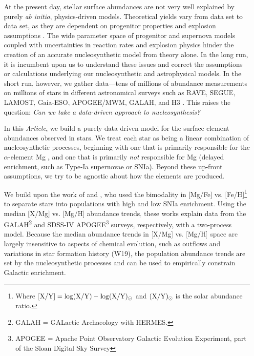 \documentclass[modern]{aastex631}
\newcommand{\documentname}{\textsl{Article}}
\begin{document}
At the present day, stellar surface abundances are not very well explained by purely \textsl{ab initio}, physics-driven models.
Theoretical yields vary from data set to data set, as they are dependent on progenitor properties and explosion assumptions \citep[e.g.,][]{rybizki2017, blancato2019, buck2021, griffith2021b}. 
The wide parameter space of progenitor and supernova models coupled with uncertainties in reaction rates and explosion physics hinder the creation of an accurate nucleosynthetic model from theory alone.
In the long run, it is incumbent upon us to understand these issues and correct the assumptions or calculations underlying our nucleosynthetic and astrophysical models.
In the short run, however, we gather data---tens of millions of abundance measurements on millions of stars in different astronomical surveys such as RAVE, SEGUE, LAMOST, Gaia-ESO, APOGEE/MWM, GALAH, and H3 \citep{steinmetz2006, yanny2009, gilmore2012, desilva2015, luo2015, majewski2017, conroy2019}.
This raises the question: \emph{Can we take a data-driven approach to nucleosynthesis?}

In this \documentname{}, we build a purely data-driven model for the surface element abundances observed in stars.
We treat each star as being a linear combination of nucleosynthetic processes, beginning with one that is primarily responsible for the $\alpha$-element Mg \citep[prompt enrichment, such as core-collapse supernovae or CCSN, e.g.,][]{andrews2017}, and one that is primarily \emph{not} responsible for Mg (delayed enrichment, such as Type-Ia supernovae or SNIa).
Beyond these up-front assumptions, we try to be agnostic about how the elements are produced.

We build upon the work of \citet[][hereafter G22]{griffith2019, griffith2022} and \citet[][hereafter W19, W22]{weinberg2019, weinberg2022}, who used the bimodality in [Mg/Fe] vs. [Fe/H]\footnote{Where $[{\rm X}/{\rm Y}] = \log({\rm X}/{\rm Y}) - \log({\rm X}/{\rm Y})_{\odot}$ and $({\rm X}/{\rm Y})_{\odot}$ is the solar abundance ratio.} \citep[e.g.,][]{fuhrmann1998, bensby2003, adibekyan2012} to separate stars into populations with high and low SNIa enrichment. Using the median [X/Mg] vs. [Mg/H] abundance trends, these works explain data from the GALAH\footnote{GALAH = GALactic Archaeology with HERMES.} and SDSS-IV APOGEE\footnote{APOGEE = Apache Point Observatory Galactic Evolution Experiment, part of the Sloan Digital Sky Survey} surveys, respectively, with a two-process model. Because the median abundance trends in [X/Mg] vs. [Mg/H] space are largely insensitive to aspects of chemical evolution, such as outflows and variations in star formation history (W19), the population abundance trends are set by the nucleosynthetic processes and can be used to empirically constrain Galactic enrichment. 
\end{document}
